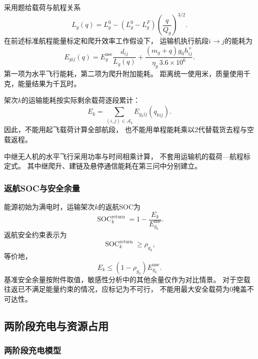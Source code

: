 \documentclass[bwprint]{gmcmthesis}
\begin{document}
采用题给载荷与航程关系
\begin{equation}
    L_g(q)
    =
    L_g^0-
    (L_g^0-L_g^F)
    \left(\frac{q}{Q_g}\right)^{3/2}.
\end{equation}
在前述标准航程能量标定和爬升效率工作假设下，
运输机执行航段$i\to j$的能耗为
\begin{equation}
    E_{gij}(q)
    =
    E_g^{\mathrm{use}}
    \frac{d_{ij}}{L_g(q)}
    +
    \frac{(m_g+q)g_0h_{ij}^{+}}
    {\eta_g\,3.6\times10^{6}}.
\end{equation}
第一项为水平飞行能耗，第二项为爬升附加能耗。
距离统一使用米，质量使用千克，能量结果为千瓦时。

架次$k$的运输能耗按实际剩余载荷逐段累计：
\begin{equation}
    E_k
    =
    \sum_{(i,j)\in\mathcal{A}_k}
    E_{g_kij}(q_{kij}).
\end{equation}
因此，不能用起飞载荷计算全部航段，
也不能用单程能耗乘以2代替载货去程与空载返程。

中继无人机的水平飞行采用功率与时间相乘计算，
不套用运输机的载荷—航程标定式。
其中继爬升、建链及悬停通信能耗在第三问中分别建立。

\subsubsection{返航SOC与安全余量}

能源初始为满电时，运输架次$k$的返航SOC为
\begin{equation}
    \operatorname{SOC}_k^{\mathrm{return}}
    =
    1-\frac{E_k}{E_{g_k}^{\mathrm{use}}}.
\end{equation}
返航安全约束表示为
\begin{equation}
    \operatorname{SOC}_k^{\mathrm{return}}
    \geq \rho_{g_k},
\end{equation}
等价地，
\begin{equation}
    E_k
    \leq
    (1-\rho_{g_k})E_{g_k}^{\mathrm{use}}.
\end{equation}
基准安全余量按附件取值，敏感性分析中的其他余量仅作为对比情景。
对于空载往返已不满足能量约束的情况，应标记为不可行，
不能用最大安全载荷为0掩盖不可达性。

\subsection{两阶段充电与资源占用}

\subsubsection{两阶段充电模型}
\end{document}
